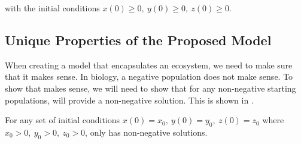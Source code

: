 with the initial conditions $x(0) \geq 0,\ y(0) \geq 0,\ z(0) \geq 0$.

\subsection{Unique Properties of the Proposed Model}\label{subsec:unique-properties-of-the-proposed-model}
When creating a model that encapsulates an ecosystem, we need to make sure that it makes sense. In biology, a negative population does not make sense. To show that  makes sense, we will need to show that for any non-negative starting populations,  will provide a non-negative solution. This is shown in .

\begin{theorem}\label{thm:positiveness}
    For any set of initial conditions $x(0) = x_0,\ y(0) = y_0,\ z(0) = z_0$ where $x_0 > 0,\ y_0 > 0,\ z_0 > 0$,  only has non-negative solutions.
\end{theorem}
